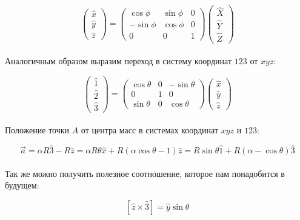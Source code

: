 \documentclass[a4paper,11.5pt]{article} %
\begin{document}
\begin{equation}
	\begin{pmatrix}
		\hat{x} \\
		\hat{y} \\
		\hat{z} 
	\end{pmatrix}
	= 
	\begin{pmatrix}
		\cos\phi & \sin\phi & 0\\
		-\sin\phi & \cos\phi & 0\\
		0 & 0 & 1
	\end{pmatrix}
	\begin{pmatrix}
		\hat{X} \\
		\hat{Y} \\
		\hat{Z} 
	\end{pmatrix}
	\label{eq2}
\end{equation}\\
Аналогичным образом выразим переход в систему координат $123$ от $xyz$:

\begin{equation}
	\begin{pmatrix}
		\hat{1} \\
		\hat{2} \\
		\hat{3} 
	\end{pmatrix}
		= 
	\begin{pmatrix}
		\cos\theta & 0 & -\sin\theta\\
		0 & 1 & 0\\
		\sin\theta & 0 & \cos\theta
	\end{pmatrix}
	\begin{pmatrix}
		\hat{x} \\
		\hat{y} \\
		\hat{z} 
	\end{pmatrix}
	\label{eq3}
\end{equation}\\
Положение точки $A$ от центра масс в системах координат $xyz$ и $123$:

\begin{equation}
\boxed{
\vec{a} = \alpha R \hat{3} - R\hat{z} 
  = \alpha R \theta \hat{x} + R(\alpha \cos\theta - 1)\hat{z}
  = R \sin\theta \hat{1} + R(\alpha - \cos\theta)\hat{3}
}
	\label{eq4}
\end{equation}\\
\newpage
Так же можно получить полезное соотношение,  которое нам понадобится в будущем:

\begin{equation}
\boxed{
	\left[\hat{z}\times \hat{3}\right] = \hat{y} \sin\theta 
}
	\label{eq5}
\end{equation}
\end{document}
